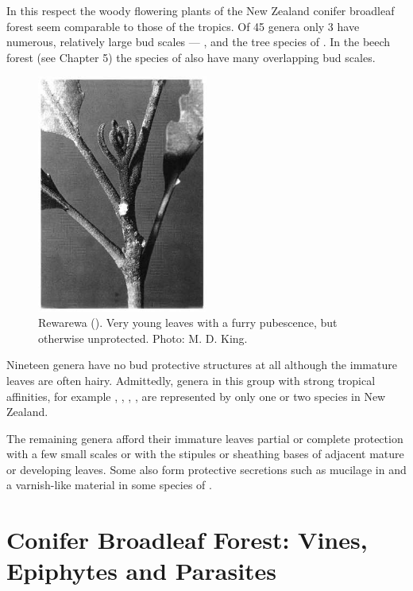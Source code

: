 In this respect the woody flowering plants of the New Zealand conifer broadleaf forest seem comparable to those of the tropics.
Of 45 genera only 3 have numerous, relatively large bud scales --- ,  and the tree species of .
In the beech forest (see Chapter 5) the species of  also have many overlapping bud scales.

\begin{figure}
	\includegraphics[width=0.5\textwidth]{graphics/figure25rewarewa.jpg}
	\centering
	\caption[Rewarewa leaves]{Rewarewa ().
	Very young leaves with a furry pubescence, but otherwise unprotected.
	Photo: M. D. King.}%
	\label{fig:25rewarewa}
\end{figure}

Nineteen genera have no bud protective structures at all although the immature leaves are often hairy.
Admittedly, genera in this group with strong tropical affinities, for example , , , , are represented by only one or two species in New Zealand.

The remaining genera afford their immature leaves partial or complete protection with a few small scales or with the stipules or sheathing bases of adjacent mature or developing leaves.
Some also form protective secretions such as mucilage in  and a varnish-like material in some species of .

\chapter{Conifer Broadleaf Forest: Vines, Epiphytes and Parasites}

